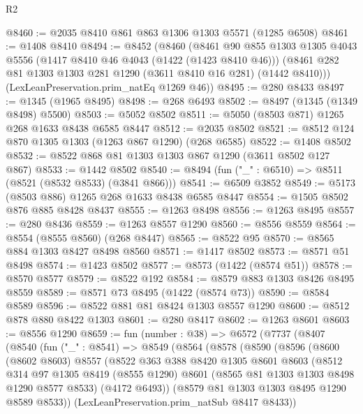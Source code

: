 \begin{lexlean}{R2}
\begin{coremodule}
@8460 := @2035 @8410 @861 @863 @1306 @1303 @5571 (@1285 @6508)
@8461 := @1408 @8410
@8494 := @8452
    (@8460
      (@8461
        @90
        @855
        @1303
        @1305
        @4043
        @5556
        (@1417 @8410 @46 @4043 (@1422 (@1423 @8410 @46)))
        (@8461 @282 @81 @1303 @1303 @281 @1290 (@3611 @8410 @16 @281) (@1442 @8410)))
      (LexLeanPreservation.prim_natEq @1269 @46))
@8495 := @280 @8433
@8497 := @1345 (@1965 @8495)
@8498 := @268 @6493
@8502 := @8497 (@1345 (@1349 @8498) @5500)
@8503 := @5052 @8502
@8511 := @5050 (@8503 @871) @1265 @268 @1633 @8438 @6585 @8447
@8512 := @2035 @8502
@8521 := @8512 @124 @870 @1305 @1303 (@1263 @867 @1290) (@268 @6585)
@8522 := @1408 @8502
@8532 := @8522 @868 @81 @1303 @1303 @867 @1290 (@3611 @8502 @127 @867)
@8533 := @1442 @8502
@8540 := @8494 (fun ("_" : @6510) => @8511 (@8521 (@8532 @8533) (@3841 @866)))
@8541 := @6509 @3852
@8549 := @5173 (@8503 @886) @1265 @268 @1633 @8438 @6585 @8447
@8554 := @1505 @8502 @876 @885 @8428 @8437
@8555 := @1263 @8498
@8556 := @1263 @8495
@8557 := @280 @8436
@8559 := @1263 @8557 @1290
@8560 := @8556 @8559
@8564 := @8554 (@8555 @8560) (@268 @8447)
@8565 := @8522 @95
@8570 := @8565 @884 @1303 @8427 @8498 @8560
@8571 := @1417 @8502
@8573 := @8571 @51 @8498
@8574 := @1423 @8502
@8577 := @8573 (@1422 (@8574 @51))
@8578 := @8570 @8577
@8579 := @8522 @192
@8584 := @8579 @883 @1303 @8426 @8495 @8559
@8589 := @8571 @73 @8495 (@1422 (@8574 @73))
@8590 := @8584 @8589
@8596 := @8522 @881 @81 @8424 @1303 @8557 @1290
@8600 := @8512 @878 @880 @8422 @1303
@8601 := @280 @8417
@8602 := @1263 @8601
@8603 := @8556 @1290
@8659 := fun (number : @38) =>
  @6572
    (@7737
      (@8407
        (@8540
          (fun ("_" : @8541) =>
          @8549
            (@8564
              (@8578
                (@8590
                  (@8596
                    (@8600
                      (@8602 @8603)
                      @8557
                      (@8522
                        @363
                        @388
                        @8420
                        @1305
                        @8601
                        @8603
                        (@8512
                          @314
                          @97
                          @1305
                          @8419
                          (@8555 @1290)
                          @8601
                          (@8565 @81 @1303 @1303 @8498 @1290 @8577 @8533)
                          (@4172 @6493))
                        (@8579 @81 @1303 @1303 @8495 @1290 @8589 @8533))
                      (LexLeanPreservation.prim_natSub @8417 @8433))

\end{coremodule}
\end{lexlean}
